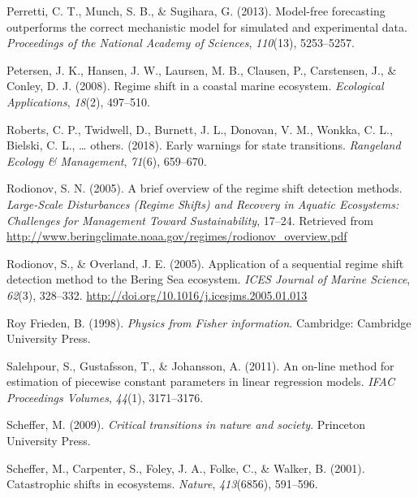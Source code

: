 \documentclass[12pt,twoside,openany]{reedthesis}
\begin{document}
\leavevmode\hypertarget{ref-perretti_model-free_2013}{}%
Perretti, C. T., Munch, S. B., \& Sugihara, G. (2013). Model-free forecasting outperforms the correct mechanistic model for simulated and experimental data. \emph{Proceedings of the National Academy of Sciences}, \emph{110}(13), 5253--5257.

\leavevmode\hypertarget{ref-petersen2008regime}{}%
Petersen, J. K., Hansen, J. W., Laursen, M. B., Clausen, P., Carstensen, J., \& Conley, D. J. (2008). Regime shift in a coastal marine ecosystem. \emph{Ecological Applications}, \emph{18}(2), 497--510.

\leavevmode\hypertarget{ref-roberts2018early}{}%
Roberts, C. P., Twidwell, D., Burnett, J. L., Donovan, V. M., Wonkka, C. L., Bielski, C. L., \ldots{} others. (2018). Early warnings for state transitions. \emph{Rangeland Ecology \& Management}, \emph{71}(6), 659--670.

\leavevmode\hypertarget{ref-rodionov_brief_2005}{}%
Rodionov, S. N. (2005). A brief overview of the regime shift detection methods. \emph{Large-Scale Disturbances (Regime Shifts) and Recovery in Aquatic Ecosystems: Challenges for Management Toward Sustainability}, 17--24. Retrieved from \url{http://www.beringclimate.noaa.gov/regimes/rodionov_overview.pdf}

\leavevmode\hypertarget{ref-rodionov_application_2005}{}%
Rodionov, S., \& Overland, J. E. (2005). Application of a sequential regime shift detection method to the Bering Sea ecosystem. \emph{ICES Journal of Marine Science}, \emph{62}(3), 328--332. \url{http://doi.org/10.1016/j.icesjms.2005.01.013}

\leavevmode\hypertarget{ref-roy_frieden_physics_1998}{}%
Roy Frieden, B. (1998). \emph{Physics from Fisher information}. Cambridge: Cambridge University Press.

\leavevmode\hypertarget{ref-salehpour2011line}{}%
Salehpour, S., Gustafsson, T., \& Johansson, A. (2011). An on-line method for estimation of piecewise constant parameters in linear regression models. \emph{IFAC Proceedings Volumes}, \emph{44}(1), 3171--3176.

\leavevmode\hypertarget{ref-scheffer_critical_2009}{}%
Scheffer, M. (2009). \emph{Critical transitions in nature and society}. Princeton University Press.

\leavevmode\hypertarget{ref-scheffer_catastrophic_2001}{}%
Scheffer, M., Carpenter, S., Foley, J. A., Folke, C., \& Walker, B. (2001). Catastrophic shifts in ecosystems. \emph{Nature}, \emph{413}(6856), 591--596.
\end{document}

